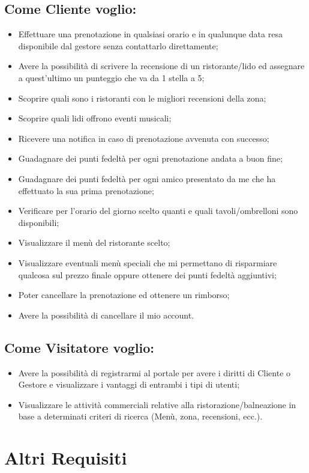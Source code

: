 \documentclass[a4paper]{article}
\begin{document}
\subsection{Come Cliente voglio:}
\begin{itemize}
\item Effettuare una prenotazione in qualsiasi orario e in qualunque data resa disponibile dal gestore senza contattarlo direttamente;
\item Avere la possibilità di scrivere la recensione di un ristorante/lido ed assegnare a quest'ultimo un punteggio che va da 1 stella a 5;
\item Scoprire quali sono i ristoranti con le migliori recensioni della zona;
\item Scoprire quali lidi offrono eventi musicali;
\item Ricevere una notifica in caso di prenotazione avvenuta con successo;
\item Guadagnare dei punti fedeltà per ogni prenotazione andata a buon fine;
\item Guadagnare dei punti fedeltà per ogni amico presentato da me che ha effettuato la sua prima prenotazione;
\item Verificare per l'orario del giorno scelto quanti e quali tavoli/ombrelloni sono disponibili;
\item Visualizzare il menù del ristorante scelto;
\item Visualizzare eventuali menù speciali che mi permettano di risparmiare qualcosa sul prezzo finale oppure ottenere dei punti fedeltà aggiuntivi;
\item Poter cancellare la prenotazione ed ottenere un rimborso;
\item Avere la possibilità di cancellare il mio account.
\end{itemize}

\subsection{Come Visitatore voglio:}
\begin{itemize}
\item Avere la possibilità di registrarmi al portale per avere i diritti di Cliente o Gestore e visualizzare i vantaggi di entrambi i tipi di utenti;

\item Visualizzare le attività commerciali relative alla ristorazione/balneazione in base a determinati criteri di ricerca (Menù, zona, recensioni, ecc.).
\end{itemize}
\newpage



\section{Altri Requisiti}
\end{document}
